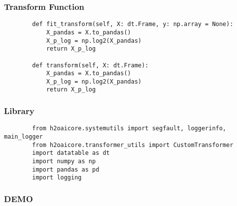 \documentclass[11pt,
               aspectratio=169,
               hyperref={colorlinks}
               ]{beamer}
\begin{document}
	\begin{frame}[fragile]
		\frametitle{Transform Function}
		\begin{verbatim}
		def fit_transform(self, X: dt.Frame, y: np.array = None):
			X_pandas = X.to_pandas()
			X_p_log = np.log2(X_pandas)
			return X_p_log

		def transform(self, X: dt.Frame):
			X_pandas = X.to_pandas()
			X_p_log = np.log2(X_pandas)
			return X_p_log
		\end{verbatim}
\end{frame}
	\begin{frame}[fragile]
		\frametitle{Library}
		\begin{verbatim}
		from h2oaicore.systemutils import segfault, loggerinfo, main_logger
		from h2oaicore.transformer_utils import CustomTransformer
		import datatable as dt
		import numpy as np
		import pandas as pd
		import logging
		\end{verbatim}
\end{frame}
	\begin{frame}
		\frametitle{DEMO}
	\end{frame}
\end{document}
